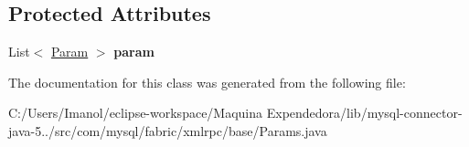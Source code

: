 \subsection*{Protected Attributes}
\begin{DoxyCompactItemize}
\item 
\mbox{\label{classcom_1_1mysql_1_1fabric_1_1xmlrpc_1_1base_1_1_params_a994cffcd8dc4e43e2b45dd6fbe898f3f}} 
List$<$ \mbox{\hyperlink{classcom_1_1mysql_1_1fabric_1_1xmlrpc_1_1base_1_1_param}{Param}} $>$ {\bfseries param}
\end{DoxyCompactItemize}


The documentation for this class was generated from the following file\+:\begin{DoxyCompactItemize}
\item 
C\+:/\+Users/\+Imanol/eclipse-\/workspace/\+Maquina Expendedora/lib/mysql-\/connector-\/java-\/5../src/com/mysql/fabric/xmlrpc/base/Params.\+java\end{DoxyCompactItemize}
